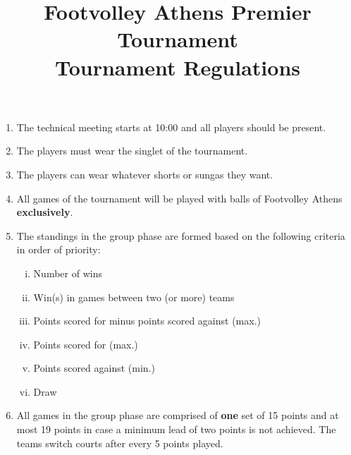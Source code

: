 \documentclass[a4paper,11pt]{article}
\title{Footvolley Athens Premier Tournament \\ Tournament Regulations}
\date{}
\begin{document}
\maketitle
\thispagestyle{fancy}

\vspace{-3cm}

\begin{enumerate}

\item The technical meeting starts at 10:00 and all players should be present.

\item The players must wear the singlet of the tournament.

\item The players can wear whatever shorts or sungas they want.

\item All games of the tournament will be played with balls of Footvolley Athens
  \textbf{exclusively}.




\item The standings in the group phase are formed based on the following
  criteria in order of priority:

  \begin{enumerate}[i)]
  \item Number of wins
  \item Win(s) in games between two (or more) teams
  \item Points scored for minus points scored against (max.)
  \item Points scored for (max.)
  \item Points scored against (min.)
  \item Draw %
  \end{enumerate}

\item All games in the group phase are comprised of \textbf{one} set of 15
  points and at most 19 points in case a minimum lead of two points is not
  achieved. The teams switch courts after every 5 points played.


\end{enumerate}
\end{document}
